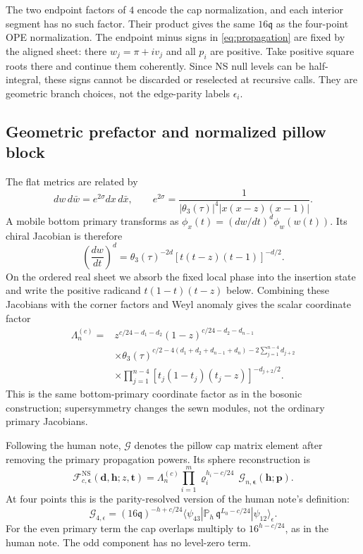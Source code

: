 \documentclass[11pt]{article}
\numberwithin{equation}{section}
\newcommand{\NS}{\mathrm{NS}}
\newcommand{\fq}{\mathfrak q}
\newcommand{\cF}{\mathcal F}
\newcommand{\cG}{\mathcal G}
\newcommand{\ve}{\boldsymbol\epsilon}
\newcommand{\vh}{\boldsymbol h}
\newcommand{\vd}{\boldsymbol d}
\begin{document}
The two endpoint factors of $4$ encode the cap normalization, and each
interior segment has no such factor. Their product gives the same
$16\fq$ as the four-point OPE normalization. The endpoint minus signs
in \eqref{eq:propagation} are fixed by the aligned sheet: there
$w_j=\pi+i v_j$ and all $p_i$ are positive. Take positive square roots
there and continue them coherently. Since NS null levels can be
half-integral, these signs cannot be discarded or reselected at recursive
calls. They are geometric branch choices, not the edge-parity labels
$\epsilon_i$.

\subsection{Geometric prefactor and normalized pillow block}

The flat metrics are related by
\begin{equation}
 dw\,d\bar w=e^{2\sigma}dx\,d\bar x,\qquad
 e^{2\sigma}=\frac1{|\theta_3(\tau)|^4|x(x-z)(x-1)|}.
\end{equation}
A mobile bottom primary transforms as
$\phi_x(t)=(dw/dt)^d\phi_w(w(t))$. Its chiral Jacobian is therefore
\begin{equation}
 \left(\frac{dw}{dt}\right)^d
 =\theta_3(\tau)^{-2d}[t(t-z)(t-1)]^{-d/2}.
 \label{eq:Jacobian}
\end{equation}
On the ordered real sheet we absorb the fixed local phase into the
insertion state and write the positive radicand $t(1-t)(t-z)$ below.
Combining these Jacobians with the corner factors and Weyl anomaly gives
the scalar coordinate factor
\begin{equation}
 \begin{aligned}
 \Lambda_n^{(c)}={}&
 z^{c/24-d_1-d_2}
 (1-z)^{c/24-d_2-d_{n-1}}\\
 &\times\theta_3(\tau)^{c/2
       -4(d_1+d_2+d_{n-1}+d_n)-2\sum_{j=1}^{n-4}d_{j+2}}\\
 &\times\prod_{j=1}^{n-4}
       [t_j(1-t_j)(t_j-z)]^{-d_{j+2}/2}.
 \end{aligned}
 \label{eq:Lambda}
\end{equation}
This is the same bottom-primary coordinate factor as in the bosonic
construction; supersymmetry changes
the sewn modules, not the ordinary primary Jacobians.

Following the human note, $\cG$ denotes the pillow cap matrix element
after removing the primary propagation powers. Its sphere reconstruction is
\begin{equation}
 \boxed{\quad
 \cF^{\NS}_{c,\ve}(\vd,\vh;z,\boldsymbol t)
 =\Lambda_n^{(c)}
   \prod_{i=1}^m\varrho_i^{h_i-c/24}\,
   \cG_{n,\ve}(\vh;\boldsymbol p).
 \quad}
 \label{eq:sphere-G}
\end{equation}
At four points this is the parity-resolved version of the human note's
definition:
\begin{equation}
 \cG_{4,\epsilon}
 =(16\fq)^{-h+c/24}
 \langle\psi_{43}|\mathbb P_h\,
       \fq^{L_0-c/24}|\psi_{12}\rangle_{\epsilon}.
\end{equation}
For the even primary term the cap overlaps multiply to $16^{h-c/24}$,
as in the human note. The odd component has no level-zero term.
\end{document}
